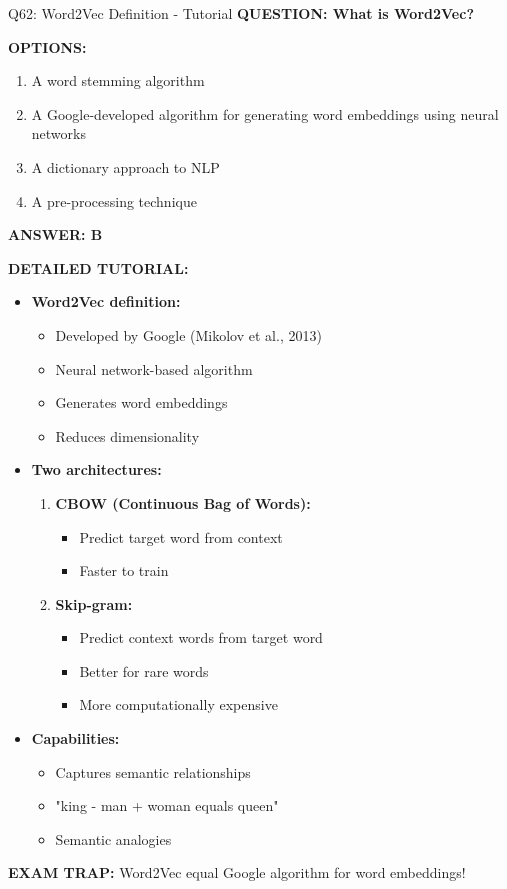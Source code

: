 \documentclass[8pt]{beamer}
\begin{document}
	\begin{frame}{Q62: Word2Vec Definition - Tutorial}
		\fontsize{6.5}{7.5}\selectfont
		\textbf{QUESTION: What is Word2Vec?}
		
		\vspace{0.1cm}
		\textbf{OPTIONS:}
		\begin{enumerate}
			\item A word stemming algorithm
			\item A Google-developed algorithm for generating word embeddings using neural networks
			\item A dictionary approach to NLP
			\item A pre-processing technique
		\end{enumerate}
		
		\vspace{0.1cm}
		\textcolor{myblue}{\textbf{ANSWER: B}}
		
		\vspace{0.1cm}
		\textbf{DETAILED TUTORIAL:}
		\begin{itemize}
			\item \textbf{Word2Vec definition:}
			\begin{itemize}
				\item Developed by Google (Mikolov et al., 2013)
				\item Neural network-based algorithm
				\item Generates word embeddings
				\item Reduces dimensionality
			\end{itemize}
			\item \textbf{Two architectures:}
			\begin{enumerate}
				\item \textbf{CBOW (Continuous Bag of Words):}
				\begin{itemize}
					\item Predict target word from context
					\item Faster to train
				\end{itemize}
				\item \textbf{Skip-gram:}
				\begin{itemize}
					\item Predict context words from target word
					\item Better for rare words
					\item More computationally expensive
				\end{itemize}
			\end{enumerate}
			\item \textbf{Capabilities:}
			\begin{itemize}
				\item Captures semantic relationships
				\item "king - man + woman equals queen"
				\item Semantic analogies
			\end{itemize}
		\end{itemize}
		
		\textcolor{myred}{\textbf{EXAM TRAP:}} Word2Vec equal \textcolor{myblue}{Google algorithm for word embeddings}!
	\end{frame}
	
\end{document}
